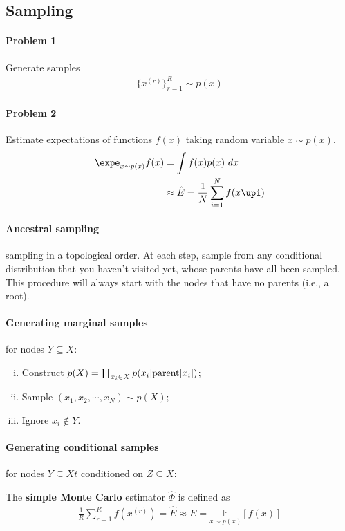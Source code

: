 \documentclass{article}
\begin{document}
	\subsection{Sampling}
	\paragraph{Problem 1} Generate samples
	\begin{align}
		\{x^{(r)}\}_{r=1}^R \sim p(x)
	\end{align}
	
	\paragraph{Problem 2} Estimate expectations of functions $f(x)$ taking random variable $x \sim p(x)$.
	\begin{align}
		\expe_{x \sim p(x)} f(x) &= \int f(x) p(x)\ dx \\
		&\approx \hat{E} = \frac{1}{N} \sum_{i=1}^N f(x\upi)
	\end{align}
	
	\paragraph{Ancestral sampling} sampling in a topological order. At each step, sample from any conditional distribution that you haven't visited yet, whose parents have all been sampled. This procedure will always start with the nodes that have no parents (i.e., a root).
	
	\paragraph{Generating marginal samples} for nodes $Y \subseteq X$:
	\begin{enumerate}[(i)]
		\item Construct $p(X) = \prod_{x_i \in X} p(x_i|\text{{parent}}[x_i])$;
		\item Sample $(x_1, x_2, \cdots, x_N) \sim p(X)$;
		\item Ignore $x_i \notin Y$.
	\end{enumerate}
	
	\paragraph{Generating conditional samples} for nodes $Y \subseteq Xt$ conditioned on $Z \subseteq X$:
	
	\begin{definition}
		The \textbf{simple Monte Carlo} estimator $\hat{\Phi}$ is defined as
		\begin{align}
			\frac{1}{R} \sum_{r=1}^{R} f\left(x^{(r)}\right)=\hat{E} \approx E=\underset{x \sim p(x)}{\mathbb{E}}[f(x)]
		\end{align}
	\end{definition}
	
\end{document}
